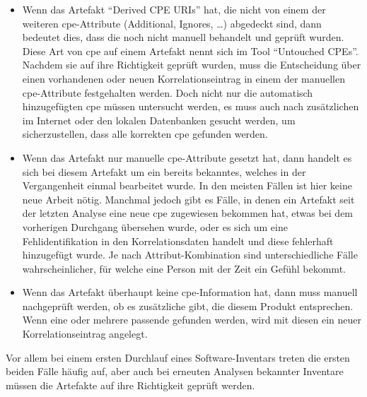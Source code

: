 \begin{itemize}
    \item Wenn das Artefakt \enquote{Derived CPE URIs} hat, die nicht von einem der weiteren \acrshort{cpe}-Attribute (Additional, Ignores, \ldots) abgedeckt sind, dann bedeutet dies, dass die  noch nicht manuell behandelt und geprüft wurden.
    Diese Art von \acrshort{cpe} auf einem Artefakt nennt sich im Tool \enquote{Untouched CPEs}.
    Nachdem sie auf ihre Richtigkeit geprüft wurden, muss die Entscheidung über einen vorhandenen oder neuen Korrelationseintrag in einem der manuellen \acrshort{cpe}-Attribute festgehalten werden.
    Doch nicht nur die automatisch hinzugefügten \acrshort{cpe} müssen untersucht werden, es muss auch nach zusätzlichen  im Internet oder den lokalen Datenbanken gesucht werden, um sicherzustellen, dass alle korrekten \acrshort{cpe} gefunden werden.

    \item Wenn das Artefakt nur manuelle \acrshort{cpe}-Attribute gesetzt hat, dann handelt es sich bei diesem Artefakt um ein bereits bekanntes, welches in der Vergangenheit einmal bearbeitet wurde.
    In den meisten Fällen ist hier keine neue Arbeit nötig.
    Manchmal jedoch gibt es Fälle, in denen ein Artefakt seit der letzten Analyse eine neue \acrshort{cpe} zugewiesen bekommen hat, etwas bei dem vorherigen Durchgang übersehen wurde, oder es sich um eine Fehlidentifikation in den Korrelationsdaten handelt und diese fehlerhaft hinzugefügt wurde.
    Je nach Attribut-Kombination sind unterschiedliche Fälle wahrscheinlicher, für welche eine Person mit der Zeit ein Gefühl bekommt.

    \item Wenn das Artefakt überhaupt keine \acrshort{cpe}-Information hat, dann muss manuell nachgeprüft werden, ob es zusätzliche gibt, die diesem Produkt entsprechen.
    Wenn eine oder mehrere passende gefunden werden, wird mit diesen ein neuer Korrelationseintrag angelegt.
\end{itemize}

Vor allem bei einem ersten Durchlauf eines Software-Inventars treten die ersten beiden Fälle häufig auf, aber auch bei erneuten Analysen bekannter Inventare müssen die Artefakte auf ihre Richtigkeit geprüft werden.
